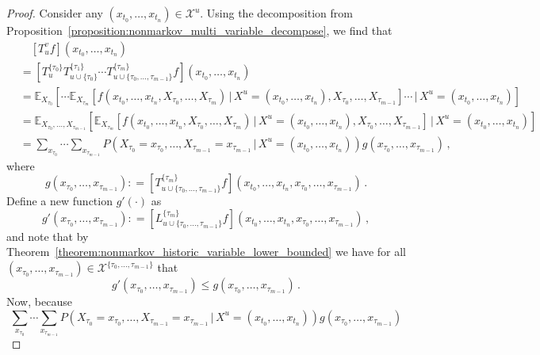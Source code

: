 \documentclass[10pt]{paper}
\newcommand{\states}{\mathcal{X}}
\newcommand{\coloneqq}{:\!=}
\begin{document}
\begin{proof}
Consider any $(x_{t_0},\ldots,x_{t_n})\in\states^u$. Using the decomposition from Proposition~\ref{proposition:nonmarkov_multi_variable_decompose}, we find that
\begin{align*}
&\quad \left[T_u^vf\right](x_{t_0},\ldots,x_{t_n}) \\
&= \left[T_u^{\{\tau_0\}}T_{u\cup\{\tau_0\}}^{\{\tau_1\}}\cdots T_{u\cup\{\tau_0,\ldots,\tau_{m-1}\}}^{\{\tau_m\}} f\right](x_{t_0},\ldots,x_{t_n}) \\
&= \mathbb{E}_{X_{\tau_0}}\left[\cdots\mathbb{E}_{X_{\tau_m}}\left[f(x_{t_0},\ldots,x_{t_n},X_{\tau_0},\ldots,X_{\tau_m})\,\vert\,X^u=(x_{t_0},\ldots,x_{t_n}),X_{\tau_0},\ldots,X_{\tau_{m-1}}\right]\cdots\,\vert\,X^u=(x_{t_0},\ldots,x_{t_n})\right] \\
&= \mathbb{E}_{X_{\tau_0},\ldots,X_{\tau_{m-1}}}\left[\mathbb{E}_{X_{\tau_m}}\left[f(x_{t_0},\ldots,x_{t_n},X_{\tau_0},\ldots,X_{\tau_m})\,\vert\,X^u=(x_{t_0},\ldots,x_{t_n}),X_{\tau_0},\ldots,X_{\tau_{m-1}}\right]\,\vert\,X^u=(x_{t_0},\ldots,x_{t_n})\right] \\
&= \sum_{x_{\tau_0}}\cdots\sum_{x_{\tau_{m-1}}} P\left(X_{\tau_0}=x_{\tau_0},\ldots,X_{\tau_{m-1}}=x_{\tau_{m-1}}\,\vert\,X^u=(x_{t_0},\ldots,x_{t_n})\right)g(x_{\tau_0},\ldots,x_{\tau_{m-1}})\,,
\end{align*}
where
\begin{equation*}
g(x_{\tau_0},\ldots,x_{\tau_{m-1}}) \coloneqq \left[T_{u\cup\{\tau_0,\ldots,\tau_{m-1}\}}^{\{\tau_m\}}f\right](x_{t_0},\ldots,x_{t_n},x_{\tau_0},\ldots,x_{\tau_{m-1}})\,.
\end{equation*}
Define a new function $g'(\cdot)$ as
\begin{equation*}
g'(x_{\tau_0},\ldots,x_{\tau_{m-1}}) \coloneqq \left[L_{u\cup\{\tau_0,\ldots,\tau_{m-1}\}}^{\{\tau_m\}}f\right](x_{t_0},\ldots,x_{t_n},x_{\tau_0},\ldots,x_{\tau_{m-1}})\,,
\end{equation*}
and note that by Theorem~\ref{theorem:nonmarkov_historic_variable_lower_bounded} we have for all $(x_{\tau_0},\ldots,x_{\tau_{m-1}})\in\states^{\{\tau_0,\ldots,\tau_{m-1}\}}$ that
\begin{equation}\label{equation:nonmarkov_multiple_variable_theorem_eq}
g'(x_{\tau_0},\ldots,x_{\tau_{m-1}}) \leq g(x_{\tau_0},\ldots,x_{\tau_{m-1}})\,.
\end{equation}
Now, because
\begin{equation*}
\sum_{x_{\tau_0}}\cdots\sum_{x_{\tau_{m-1}}} P\left(X_{\tau_0}=x_{\tau_0},\ldots,X_{\tau_{m-1}}=x_{\tau_{m-1}}\,\vert\,X^u=(x_{t_0},\ldots,x_{t_n})\right)g(x_{\tau_0},\ldots,x_{\tau_{m-1}})

\end{equation*}
\end{proof}
\end{document}
